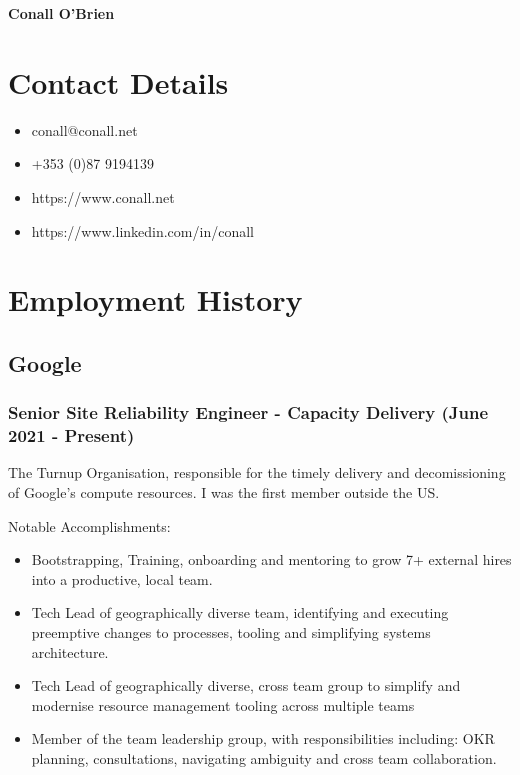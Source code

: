 \documentclass[a4paper, 10pt] {article}
\begin{document}
\begingroup
  \centering
  \LARGE \textbf{Conall O'Brien}\\[1.5em]
\endgroup

\hrulefill

\section*{Contact Details}

\begin{itemize}[itemsep=2pt,parsep=2pt]
 \item conall@conall.net
 \item +353 (0)87 9194139
 \item https://www.conall.net
 \item https://www.linkedin.com/in/conall
\end{itemize}

\hrulefill

\section*{Employment History}

\subsection*{Google}

\subsubsection*{Senior Site Reliability Engineer - Capacity Delivery (June 2021 - Present)}

The Turnup Organisation, responsible for the timely delivery and decomissioning of Google's compute resources. I was the first member outside the US.

\vspace{4mm}  %

Notable Accomplishments:

\begin{itemize}[itemsep=2pt,parsep=2pt]
  \item Bootstrapping, Training, onboarding and mentoring to grow 7+ external hires into a productive, local team.
  \item Tech Lead of geographically diverse team, identifying and executing preemptive changes to processes, tooling and simplifying systems architecture.
  \item Tech Lead of geographically diverse, cross team group to simplify and modernise resource management tooling across multiple teams
  \item Member of the team leadership group, with responsibilities including: OKR planning, consultations, navigating ambiguity and cross team collaboration.
\end{itemize}
\end{document}
